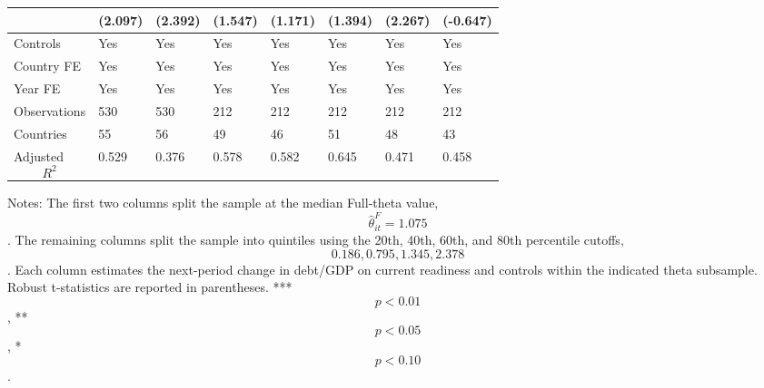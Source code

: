 \begin{table}[H]
\begin{threeparttable}
\begin{tabularx}{\textwidth}{lYYYYYYY}
  & (2.097) & (2.392) & (1.547) & (1.171) & (1.394) & (2.267) & (-0.647) \\
\midrule
Controls & Yes & Yes & Yes & Yes & Yes & Yes & Yes \\
Country FE & Yes & Yes & Yes & Yes & Yes & Yes & Yes \\
Year FE & Yes & Yes & Yes & Yes & Yes & Yes & Yes \\
Observations & 530 & 530 & 212 & 212 & 212 & 212 & 212 \\
Countries & 55 & 56 & 49 & 46 & 51 & 48 & 43 \\
Adjusted $$R^2$$ & 0.529 & 0.376 & 0.578 & 0.582 & 0.645 & 0.471 & 0.458 \\
\bottomrule
\end{tabularx}
\begin{tablenotes}[flushleft]\footnotesize
\item Notes: The first two columns split the sample at the median Full-theta value, $$\widehat{\theta}^{F}_{it}=1.075$$. The remaining columns split the sample into quintiles using the 20th, 40th, 60th, and 80th percentile cutoffs, $$0.186, 0.795, 1.345, 2.378$$. Each column estimates the next-period change in debt/GDP on current readiness and controls within the indicated theta subsample. Robust t-statistics are reported in parentheses. *** $$p<0.01$$, ** $$p<0.05$$, * $$p<0.10$$.
\end{tablenotes}
\end{threeparttable}
\end{table}
